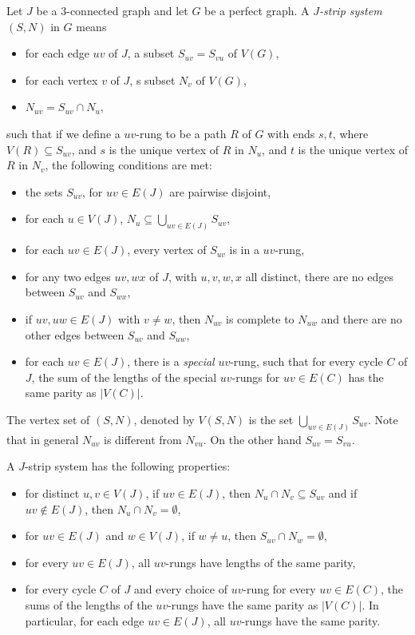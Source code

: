 \begin{defnTwo}
  Let $J$ be a 3-connected graph and let $G$ be a perfect graph. A \emph{$J$-strip system} $(S, N)$ in $G$ means
  \begin{itemize}
    \item for each edge $uv$ of $J$, a subset $S_{uv} = S_{vu}$ of $V(G)$,
    \item for each vertex $v$ of $J$, s subset $N_v$ of $V(G)$,
    \item $N_{uv} = S_{uv} \cap N_u$,
  \end{itemize}
  such that if we define a $uv$-rung to be a path $R$ of $G$ with ends $s, t$, where $V(R) \subseteq S_{uv}$, and $s$ is the unique vertex of $R$ in $N_u$, and $t$ is the unique vertex of $R$ in $N_v$, the following conditions are met:
  \begin{itemize}
    \item the sets $S_{uv}$, for $uv \in E(J)$ are pairwise disjoint,
    \item for each $u \in V(J)$, $N_u \subseteq \bigcup_{uv \in E(J)} S_{uv}$,
    \item for each $uv \in E(J)$, every vertex of $S_{uv}$ is in a $uv$-rung,
    \item for any two edges $uv, wx$ of $J$, with $u, v, w, x$ all distinct, there are no edges between $S_{uv}$ and $S_{wx}$,
    \item if $uv, uw \in E(J)$ with $v \neq w$, then $N_{uv}$ is complete to $N_{uw}$ and there are no other edges between $S_{uv}$ and $S_{uw}$,
    \item for each $uv \in E(J)$, there is a \emph{special} $uv$-rung, such that for every cycle $C$ of $J$, the sum of the lengths of the special $uv$-rungs for $uv \in E(C)$ has the same parity as $|V(C)|$.
  \end{itemize}
\end{defnTwo}

\noindent The vertex set of $(S, N)$, denoted by $V(S, N)$ is the set $\bigcup_{uv \in E(J)} S_{uv}$. Note that in general $N_{uv}$ is different from $N_{vu}$. On the other hand $S_{uv} = S_{vu}$.

A $J$-strip system has the following properties:
\begin{itemize}
  \item for distinct $u, v \in V(J)$, if $uv \in E(J)$, then $N_u \cap N_v \subseteq S_{uv}$ and if $uv \notin E(J)$, then $N_u \cap N_v = \emptyset$,
  \item for $uv \in E(J)$ and $w \in V(J)$, if $w \neq u$, then $S_{uv} \cap N_w = \emptyset$,
  \item for every $uv \in E(J)$, all $uv$-rungs have lengths of the same parity,
  \item for every cycle $C$ of $J$ and every choice of $uv$-rung for every $uv \in E(C)$, the sums of the lengths of the $uv$-rungs have the same parity as $|V(C)|$. In particular, for each edge $uv \in E(J)$, all $uv$-rungs have the same parity.
\end{itemize}

